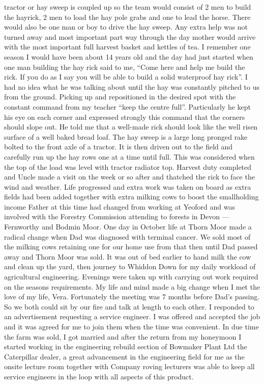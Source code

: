 tractor or hay sweep is coupled up so the team would consist of 2 men to build
the hayrick, 2 men to load the hay pole grabs and one to lead the horse.  There
would also be one man or boy to drive the hay sweep.  Any extra help was not
turned away and most important part way through the day mother would arrive
with the most important full harvest basket and kettles of tea.  I remember one
season I would have been about 14 years old and the day had just started when
one man building the hay rick said to me, ``Come here and help me build the
rick.  If you do as I say you will be able to build a solid waterproof hay
rick''.  I had no idea what he was talking about until the hay was constantly
pitched to us from the ground.  Picking up and repositioned in the desired spot
with the constant command from my teacher ``keep the centre full''.
Particularly he kept his eye on each corner and expressed strongly this command
that the corners should slope out.  He told me that a well-made rick should
look like the well risen surface of a well baked bread loaf.   The hay sweep is
a large long pronged rake bolted to the front axle of a tractor. It is then
driven out to the field and carefully run up the hay rows one at a time until
full.  This was considered when the top of the load was level with tractor
radiator top.  Harvest duty completed and Uncle made a visit on the week or so
after and thatched the rick to face the wind and weather. Life progressed and
extra work was taken on board as extra fields had been added together with
extra milking cows to boost the smallholding income   Father at this time had
changed from working at Yeoford and was involved with the Forestry Commission
attending to forests in Devon --- Fernworthy and Bodmin Moor. One day in October
life at Thorn Moor made a radical change when Dad was diagnosed with terminal
cancer.  We sold most of the milking cows retaining one for our home use from
that then until Dad passed away and Thorn Moor was sold. It was out of bed
earlier to hand milk the cow and clean up the yard, then journey to Whiddon
Down for my daily workload of agricultural engineering.  Evenings were taken up
with carrying out work required on the seasons requirements.  My life and mind
made a big change when I met the love of my life, Vera.  Fortunately the
meeting was 7 months before Dad's passing.  So we both could sit by our fire
and talk at length to each other.  I responded to an advertisement requesting a
service engineer.  I was offered and accepted the job and it was agreed for me
to join them when the time was convenient.  In due time the farm was sold, I
got married and after the return from my honeymoon I started working in the
engineering rebuild section of Bowmaker Plant Ltd the Caterpillar dealer, a
great advancement in the engineering field for me as the onsite lecture room
together with Company roving lecturers was able to keep all service engineers
in the loop with all aspects of this product.
